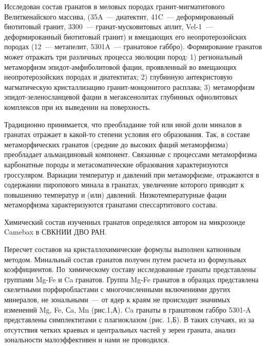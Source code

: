  

\makeProcTitle
{}

Исследован состав гранатов в меловых породах гранит-мигматитового Велиткенайского массива, (35A~--- диатектит, 41C~--- деформированный биотитовый гранит, 3300~--- гранат-мусковитовых аплит, Vel-1~--- деформированный биотитовый гранит) и вмещающих его неопротерозойских породах (12~--- метапелит, 5301A~--- гранатовое габбро).  Формирование гранатов может отражать три различных процесса эволюции пород: 1) региональный метаморфизм эпидот-амфиболитовой фации, проявленный во вмещающих неопротерозойских породах и диатектитах; 2) глубинную антекристовую магматическую кристаллизацию гранит-монцонитого расплава; 3) метаморфизм эпидот-зеленосланцевой фации в мегаксенолитах глубинных офиолитовых комплексов при их выведении на поверхность.

Традиционно принимается, что преобладание той или иной доли миналов в гранатах отражает в какой-то степени  условия его образования.  Так, в составе метаморфических гранатов  (средние до высоких фаций метаморфизма) преобладает альмандиновый компонент. Связанные с процессами метаморфизма карбонатные породы и метасоматические образования характеризуются гроссуляром. Вариации температур и давлений при метаморфизме, отражаются  в содержании пиропового минала в гранатах, увеличение которого приводит к повышению температур и (или) давлений. Низкотемпературные фации метаморфизма характеризуются гранатами спессартитового состава.

Химический состав изученных гранатов определялся автором на микрозонде Camebax в СВКНИИ ДВО РАН.

Пересчет составов на кристаллохимические формулы выполнен катионным методом. Минальный состав гранатов получен путем расчета из формульных коэффициентов. По~химическому составу исследованные гранаты представлены группами Mg-Fe и Ca гранатов. Группа Mg-Fe гранатов в образцах представлена  скелетными порфиробластами с многочисленными включениями других минералов, не  зональными~--- от ядер к краям не происходит значимых изменений Mg, Fe, Сa, Mn (рис.1,А). Ca гранаты в гранатовом габбро 5301-A представлены симплектитами с плагиоклазом (рис. 1,Б).  В таких случаях, из за отсутствия четких  краевых и  центральных частей у зерен граната, анализ зональности малоэффективен и нами не проводился.

